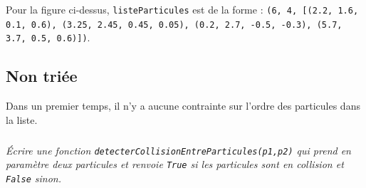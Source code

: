 \documentclass[10pt,fleqn]{article} %
\begin{document}
\begin{exemple} Pour la figure ci-dessus, \texttt{listeParticules} est de la forme :
\texttt{(6, 4, [(2.2, 1.6, 0.1, 0.6), (3.25, 2.45, 0.45, 0.05), (0.2, 2.7, -0.5, -0.3),
(5.7, 3.7, 0.5, 0.6)])}.
\end{exemple}

\subsection*{Non triée}

Dans un premier temps, il n'y a aucune contrainte sur l'ordre des particules dans la liste. 
\subparagraph{}
\textit{Écrire une fonction \texttt{detecterCollisionEntreParticules(p1,p2)} qui prend en paramètre deux particules et renvoie \texttt{True} si les particules sont en collision et \texttt{False} sinon.}



\subparagraph{}
\textit{}


\subparagraph{}
\textit{}

\subparagraph{}
\textit{}


\subparagraph{}
\textit{}


\subparagraph{}
\textit{}


\subparagraph{}
\textit{}


\subparagraph{}
\textit{}
\end{document}
